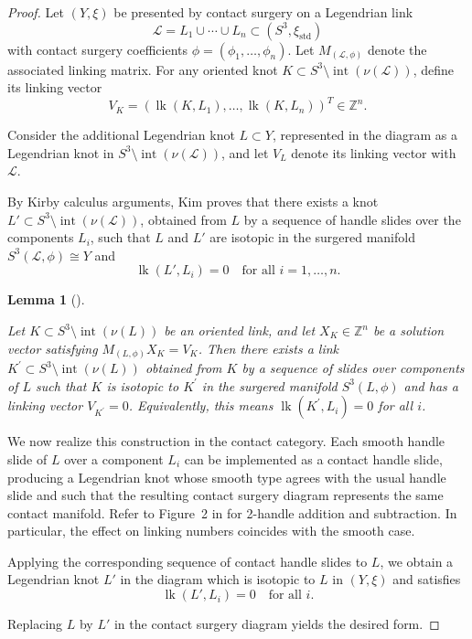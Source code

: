 \documentclass[12pt]{amsart}
\newtheorem{lemma}[theorem]{Lemma}
\theoremstyle{definition}
\theoremstyle{definition}
\begin{document}
\begin{proof}


Let $(Y,\xi)$ be presented by contact surgery on a Legendrian link
\[
\mathcal{L} = L_1 \cup \cdots \cup L_n \subset (S^3,\xi_{\mathrm{std}})
\]
with contact surgery coefficients $\phi = (\phi_1,\dots,\phi_n)$. Let $M_{(\mathcal{L},\phi)}$ denote the associated linking matrix. For any oriented knot $K \subset S^3 \setminus \operatorname{int}(\nu(\mathcal{L}))$, define its linking vector
\[
V_K = (\operatorname{lk}(K,L_1), \dots, \operatorname{lk}(K,L_n))^T \in \mathbb{Z}^n.
\]

Consider the additional Legendrian knot $L \subset Y$, represented in the diagram as a Legendrian knot in $S^3 \setminus \operatorname{int}(\nu(\mathcal{L}))$, and let $V_L$ denote its linking vector with $\mathcal{L}$.


By Kirby calculus arguments, Kim \cite{Kim} proves that there exists a knot $L' \subset S^3 \setminus \operatorname{int}(\nu(\mathcal{L}))$, obtained from $L$ by a sequence of handle slides over the components $L_i$, such that $L$ and $L'$ are isotopic in the surgered manifold $S^3(\mathcal{L},\phi) \cong Y$ and
\[
\operatorname{lk}(L',L_i) = 0 \quad \text{for all } i=1,\dots,n.
\]

 \begin{lemma}[{\cite[Lemma 2.5]{Kim}}]\label{lem:linking_zero}

Let $K \subset S^{3} \setminus \operatorname{int}(\nu(L))$ be an oriented link, and let $X_{K} \in \mathbb{Z}^{n}$ be a solution vector satisfying $M_{(L,\phi)}X_{K} = V_{K}$. Then there exists a link $K^{\prime} \subset S^{3} \setminus \operatorname{int}(\nu(L))$ obtained from $K$ by a sequence of slides over components of $L$ such that $K$ is isotopic to $K^{\prime}$ in the surgered manifold $S^{3}(L,\phi)$ and has a linking vector $V_{K^{\prime}} = 0$. Equivalently, this means $\operatorname{lk}(K^{\prime}, L_{i}) = 0$ for all $i$.
\end{lemma} 



We now realize this construction in the contact category. Each smooth handle slide of $L$ over a component $L_i$ can be implemented as a contact handle slide, producing a Legendrian knot whose smooth type agrees with the usual handle slide and such that the resulting contact surgery diagram represents the same contact manifold. Refer to Figure~2 in \cite{DG01} for 2-handle  addition and subtraction. In particular, the effect on linking numbers coincides with the smooth case.

Applying the corresponding sequence of contact handle slides to $L$, we obtain a Legendrian knot $L'$ in the diagram which is isotopic to $L$ in $(Y,\xi)$ and satisfies
\[
\operatorname{lk}(L',L_i) = 0 \quad \text{for all } i.
\]

Replacing $L$ by $L'$ in the contact surgery diagram yields the desired form.

\end{proof}
\end{document}

